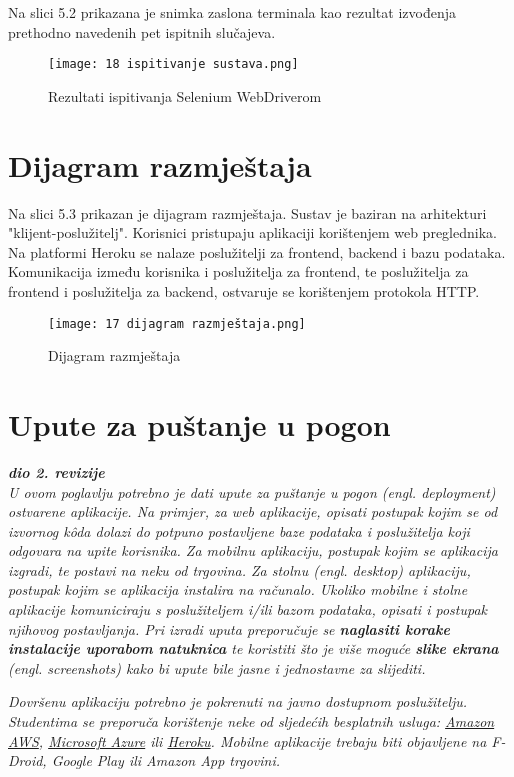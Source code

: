 			Na slici 5.2 prikazana je snimka zaslona terminala kao rezultat izvođenja prethodno navedenih pet ispitnih slučajeva.
			
			\begin{figure}[H]
					\centering
					\texttt{[image: 18 ispitivanje sustava.png]}
					\caption{Rezultati ispitivanja Selenium WebDriverom}
				\end{figure}	
			\eject 
		
		
		\section{Dijagram razmještaja}
		
		Na slici 5.3 prikazan je dijagram razmještaja. Sustav je baziran na arhitekturi "klijent-poslužitelj". Korisnici pristupaju aplikaciji korištenjem web preglednika. Na platformi Heroku se nalaze poslužitelji za frontend, backend i bazu podataka. Komunikacija između korisnika i poslužitelja za frontend, te poslužitelja za frontend i poslužitelja za backend, ostvaruje se korištenjem protokola HTTP.
			
			\begin{figure}[H]
					\centering
					\texttt{[image: 17 dijagram razmještaja.png]}
					\caption{Dijagram razmještaja}
				\end{figure}	
			
			\eject 
		
		\section{Upute za puštanje u pogon}
		
			\textbf{\textit{dio 2. revizije}}\\
		
			 \textit{U ovom poglavlju potrebno je dati upute za puštanje u pogon (engl. deployment) ostvarene aplikacije. Na primjer, za web aplikacije, opisati postupak kojim se od izvornog kôda dolazi do potpuno postavljene baze podataka i poslužitelja koji odgovara na upite korisnika. Za mobilnu aplikaciju, postupak kojim se aplikacija izgradi, te postavi na neku od trgovina. Za stolnu (engl. desktop) aplikaciju, postupak kojim se aplikacija instalira na računalo. Ukoliko mobilne i stolne aplikacije komuniciraju s poslužiteljem i/ili bazom podataka, opisati i postupak njihovog postavljanja. Pri izradi uputa preporučuje se \textbf{naglasiti korake instalacije uporabom natuknica} te koristiti što je više moguće \textbf{slike ekrana} (engl. screenshots) kako bi upute bile jasne i jednostavne za slijediti.}
			
			
			 \textit{Dovršenu aplikaciju potrebno je pokrenuti na javno dostupnom poslužitelju. Studentima se preporuča korištenje neke od sljedećih besplatnih usluga: \href{https://aws.amazon.com/}{Amazon AWS}, \href{https://azure.microsoft.com/en-us/}{Microsoft Azure} ili \href{https://www.heroku.com/}{Heroku}. Mobilne aplikacije trebaju biti objavljene na F-Droid, Google Play ili Amazon App trgovini.}
			
			
			\eject 